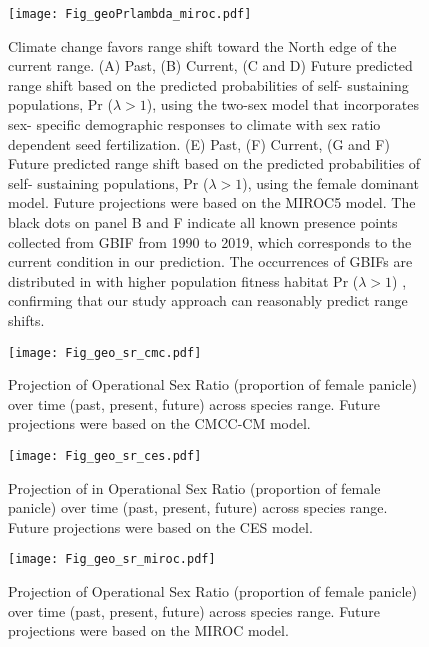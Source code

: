 \documentclass[9pt,twoside,lineno]{pnas-new}
\begin{document}
\begin{figure}
\centering
\texttt{[image: Fig\_geoPrlambda\_miroc.pdf]}
\caption{Climate change favors range shift toward the North edge of the current range.
			(A) Past, (B) Current, (C and D) Future predicted range shift based on the predicted probabilities of self- sustaining populations, Pr ($\lambda > 1$), using the two-sex model that incorporates sex- specific demographic responses to climate with sex ratio dependent seed fertilization.
			(E) Past, (F) Current, (G and F) Future  predicted range shift based on the predicted probabilities of self- sustaining populations, Pr ($\lambda > 1$), using the female dominant model.
			Future projections were based on the MIROC5 model.
			The black dots on panel B and F indicate all known presence points collected from GBIF from 1990 to 2019, which corresponds to the current condition in our prediction. 
			The occurrences of GBIFs are distributed in with higher population fitness habitat Pr ($\lambda > 1$) , confirming that our study approach can reasonably predict range shifts.}
\label{Sup:geoprojmiroc}
\end{figure}
\clearpage

\begin{figure}[H]
	\begin{center}
		\texttt{[image: Fig\_geo\_sr\_cmc.pdf]}
		\caption{Projection  of Operational Sex Ratio (proportion of female panicle) over time (past, present, future) across species range.
			Future projections were based on the CMCC-CM model.
			}
		\label{Sup:geoosrprojcmc}
	\end{center}
\end{figure}
\clearpage


\begin{figure}[H]
	\begin{center}
		\texttt{[image: Fig\_geo\_sr\_ces.pdf]}
		\caption{Projection of in Operational Sex Ratio (proportion of female panicle) over  time (past, present, future) across species range.
			Future projections were based on the CES model.
			}
		\label{Sup:geoosrprojces}
	\end{center}
\end{figure}
\clearpage


\begin{figure}[H]
	\begin{center}
		\texttt{[image: Fig\_geo\_sr\_miroc.pdf]}
		\caption{Projection of Operational Sex Ratio (proportion of female panicle) over time (past, present, future) across species range.
			Future projections were based on the MIROC model.
			}
		\label{Sup:geoosrprojmiroc}
	\end{center}
\end{figure}
\clearpage
\end{document}
